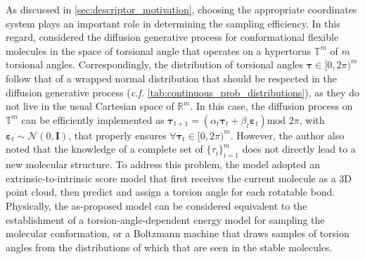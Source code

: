 As discussed in \cref{sec:descriptor_motivation},  choosing the appropriate coordinates system plays an important role in determining the sampling efficiency. In this regard,  \citet{jing2022torsional}  considered the diffusion generative process for conformational flexible molecules in the space of torsional angle that operates on a hypertorus $\mathbb{T}^{m}$ of $m$ torsional angles. Correspondingly, the distribution of torsional angles $\boldsymbol{\tau}\in[0,2\pi)^m$ follow  that of a wrapped normal distribution that should be respected in the diffusion generative process (\emph{c.f.} \cref{tab:continuous_prob_distributions}), as they do not live in the usual Cartesian space of $\mathbb{R}^{m}$. In this case, the diffusion process on $\mathbb{T}^{m}$ can be efficiently implemented as $\boldsymbol{\tau}_{t+1}=\left(\alpha_t\boldsymbol{\tau}_t+\beta_t\boldsymbol{\varepsilon}_t\right)\mbox{mod 2}\pi$, with $\boldsymbol{\varepsilon}_t\sim\mathcal{N}(0,\bm{I})$, that properly ensures $\forall\boldsymbol{\tau}_t\in[0,2\pi)^m$.
However, the author also noted that the knowledge of a complete set of $\{\tau_i\}_{i=1}^{m}$  does not directly lead to a new molecular structure. To address this problem, the model adopted an extrinsic-to-intrinsic score model that first receives the current molecule as a 3D point cloud, then predict and assign a torsion angle for each rotatable bond. Physically, the as-proposed model can be considered equivalent to the establishment of a torsion-angle-dependent energy model for sampling the molecular conformation,\cite{cheng2024response} or a Boltzmann machine\cite{noe2019boltzmann} that draws samples of torsion angles from the distributions of which that are seen in the stable molecules.

